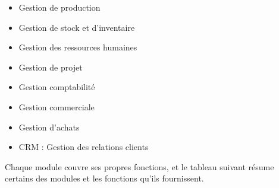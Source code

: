 \begin{itemize}
    \item Gestion de production
    \item Gestion de stock et d’inventaire
    \item Gestion des ressources humaines 
    \item Gestion de projet
    \item Gestion comptabilité
    \item Gestion commerciale
    \item Gestion d’achats
    \item CRM : Gestion des relations clients\\
\end{itemize}

Chaque module couvre ses propres fonctions, et le tableau suivant résume certains des modules et les fonctions qu'ils fournissent.

